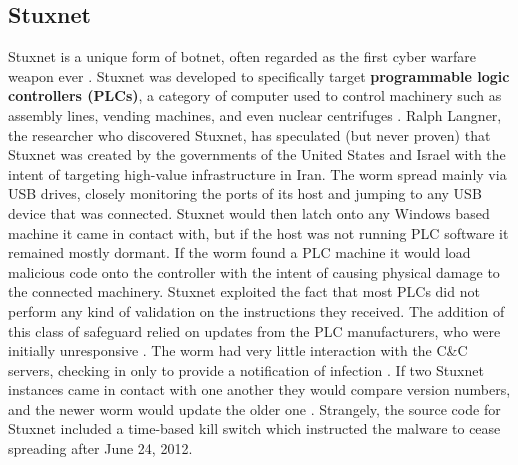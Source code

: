 \subsection{Stuxnet}
Stuxnet is a unique form of botnet, often regarded as the first cyber
warfare weapon ever \cite{stuxnet}. Stuxnet
was developed to specifically target \textbf{programmable logic controllers (PLCs)},
a category of computer used to control machinery such as assembly lines,
vending machines, and even nuclear centrifuges \cite{stuxnet}.  Ralph Langner,
the researcher who discovered Stuxnet, has speculated (but never proven)
that Stuxnet was created by the governments of the United States and Israel with the intent of
targeting high-value infrastructure in Iran. The worm spread mainly via USB drives,
closely monitoring the ports of its host and jumping to any USB device that was connected.
Stuxnet would then latch onto any Windows based machine it came in
contact with, but if the host was not running PLC software it remained mostly dormant.
If the worm found a PLC machine it would load malicious code onto the controller
with the intent of causing physical damage to the connected machinery. Stuxnet exploited the fact that most
PLCs did not perform any kind of validation on the instructions they received.
The addition of this class of safeguard relied on updates from the PLC manufacturers, who were
initially unresponsive \cite{stuxnet}.
The worm had very little interaction with the C\&C servers, checking in only
to provide a notification of infection \cite{stuxnet}.  If two Stuxnet instances
came in contact with one another they would compare version numbers, and
the newer worm would update the older one \cite{stuxnet}. Strangely, the source
code for Stuxnet included a time-based kill switch which instructed the malware
to cease spreading after June 24, 2012.


